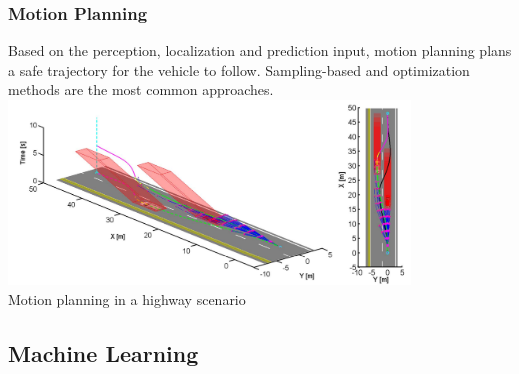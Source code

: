 \begin{frame}
\frametitle{Motion Planning}
Based on the perception, localization and prediction input, motion planning
plans a safe trajectory for the vehicle to follow. Sampling-based and
optimization methods are the most common approaches.\\
\centering
\includegraphics[width=0.8\textwidth]{images/ma_motionplanning.png}\\
\footnotesize{Motion planning in a highway scenario \cite{Ma2015}}
\end{frame}

\subsection{Machine Learning}

